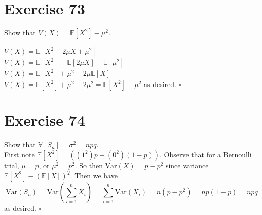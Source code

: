 \documentclass{article}
\begin{document}
\section*{Exercise 73}
Show that $V(X) = \mathbb{E}[X^2] - \mu^2$.
\begin{flushleft}
    $V(X) = \mathbb{E}[X^2 - 2\mu X + \mu^2]$ \\
    $V(X) = \mathbb{E}[X^2] - \mathbb{E}[2\mu X] + \mathbb{E}[\mu^2]$ \\
    $V(X) = \mathbb{E}[X^2] + \mu^2 - 2\mu \mathbb{E}[X]$ \\
    $V(X) = \mathbb{E}[X^2] + \mu^2 - 2\mu^2 = \mathbb{E}[X^2] - \mu^2$ as desired. $\square$
\end{flushleft}

\section*{Exercise 74}
\begin{flushleft}
    Show that $\mathbb{V}[S_n] = \sigma^2 = npq$. \\
    First note $\mathbb{E}[X^2] = ((1^2)p + (0^2)(1-p))$. Observe that for a Bernoulli trial, $\mu = p$, or $\mu ^2 = p^2$. So then $\text{Var}(X) = p - p^2$ since variance = $\mathbb{E}[X^2] - (\mathbb{E}[X])^2$. Then we have
    \begin{equation*}
        \text{Var}(S_n) = \text{Var}(\sum_{i=1}^{n}{X_i}) = \sum_{i=1}^{n}{\text{Var}(X_i)} = n(p-p^2) = np(1-p) = npq
    \end{equation*}
    as desired. $\square$
\end{flushleft}
\end{document}
